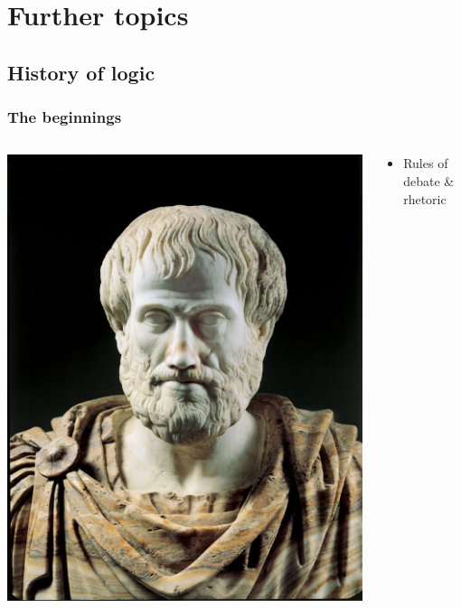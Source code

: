 ﻿

\setcounter{section}{12}

\section{Further topics}

\subsection{History of logic}

\begin{frame}
  \frametitle{The beginnings}
  \begin{columns}
    \begin{column}{.5\textwidth}
    \includegraphics[height=.8\textheight]{../assets/aristotle}
    \end{column}
    \begin{column}{.5\textwidth}
      \begin{itemize}[<+->]
        \item Rules of debate \& rhetoric

\end{itemize}
\end{column}
\end{columns}
\end{frame}
